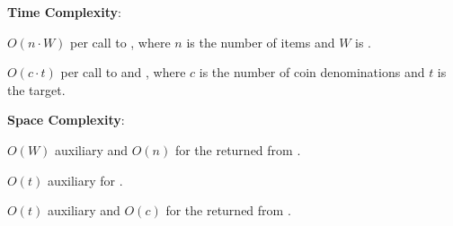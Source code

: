 \textbf{Time Complexity}:
\begin{compactitem}
  \item $O(n \cdot W)$ per call to , where $n$ is the number of items and $W$ is .
  \item $O(c \cdot t)$ per call to  and , where $c$ is the number of coin denominations and $t$ is the target.
\end{compactitem}

\textbf{Space Complexity}:
\begin{compactitem}
  \item $O(W)$ auxiliary and $O(n)$ for the returned  from .
  \item $O(t)$ auxiliary for .
  \item $O(t)$ auxiliary and $O(c)$ for the returned  from .
\end{compactitem}

